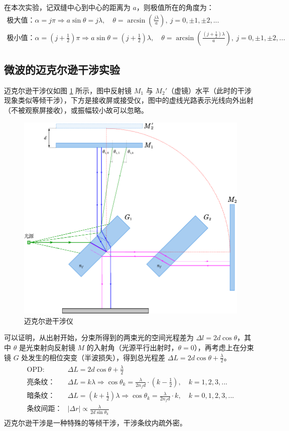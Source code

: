 \documentclass[UTF8]{article}
\theoremstyle{MyLineTheoremStyle} %
\theoremstyle{MyBlockTheoremStyle} %
\theoremstyle{MySubsubsectionStyle} %
\begin{document}
在本次实验，记双缝中心到中心的距离为 $a$，则极值所在的角度为：
\begin{gather}
\text{极大值：} \alpha = j\pi \Longrightarrow a \sin \theta = j \lambda,\quad \theta =  \arcsin \left(\frac{j\lambda}{a}\right),\ j = 0, \pm 1, \pm 2, ... \\
\text{极小值：} \alpha = (j + \frac{1}{2})\pi \Longrightarrow a \sin \theta = (j + \frac{1}{2}) \lambda,\quad \theta =  \arcsin \left(\frac{(j + \frac{1}{2})\lambda}{a}\right),\ j = 0, \pm 1, \pm 2, ...
\end{gather}

\subsection{微波的迈克尔逊干涉实验}
迈克尔逊干涉仪如图 \ref{迈克尔逊干涉仪} 所示，图中反射镜 $M_1$ 与 $M_2'$（虚镜）水平（此时的干涉现象类似等倾干涉），下方是接收屏或接受仪，图中的虚线光路表示光线向外出射（不被观察屏接收），或振幅较小故可以忽略。

\begin{figure}[H]\centering
\includegraphics[width=0.7\columnwidth]{assets/0/迈克尔逊干涉仪.pdf}
\caption{迈克尔逊干涉仪}\label{迈克尔逊干涉仪}
\end{figure}

可以证明，从出射开始，分束所得到的两束光的空间光程差为 $\Delta l = 2 d \cos \theta$，其中 $\theta$ 是光束射向反射镜 $M$ 的入射角（光源平行出射时，$\theta = 0$），再考虑上在分束镜 $G$ 处发生的相位突变（半波损失），得到总光程差 $\Delta L = 2 d \cos \theta + \frac{\lambda}{2}$。
\begin{align}
\begin{matrix}
\displaystyle \text{OPD: }& \Delta L = 2 d \cos \theta + \frac{\lambda}{2} \\ 
\displaystyle \text{亮条纹：}&\Delta L = k \lambda \Longrightarrow \cos \theta_k = \frac{\lambda}{2 n_f d} \cdot (k - \frac{1}{2}),\quad k = 1, 2, 3, ... \\ 
\displaystyle \text{暗条纹：}&\Delta L = (k + \frac{1}{2}) \lambda \Longrightarrow \cos \theta_k = \frac{\lambda}{2 n_f d} \cdot k,\quad k = 0, 1, 2, 3, ...\\ 
\displaystyle \text{条纹间距：}& | \Delta r | \propto  \frac{\lambda}{2d \sin \theta_k}
\end{matrix}
\end{align}
迈克尔逊干涉是一种特殊的等倾干涉，干涉条纹内疏外密。
\end{document}
